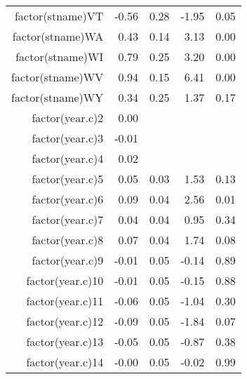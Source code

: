 \begin{table}[ht]
\begin{tabular}{rrrrr}
  factor(stname)VT & -0.56 & 0.28 & -1.95 & 0.05 \\ 
  factor(stname)WA & 0.43 & 0.14 & 3.13 & 0.00 \\ 
  factor(stname)WI & 0.79 & 0.25 & 3.20 & 0.00 \\ 
  factor(stname)WV & 0.94 & 0.15 & 6.41 & 0.00 \\ 
  factor(stname)WY & 0.34 & 0.25 & 1.37 & 0.17 \\ 
  factor(year.c)2 & 0.00 &  &  &  \\ 
  factor(year.c)3 & -0.01 &  &  &  \\ 
  factor(year.c)4 & 0.02 &  &  &  \\ 
  factor(year.c)5 & 0.05 & 0.03 & 1.53 & 0.13 \\ 
  factor(year.c)6 & 0.09 & 0.04 & 2.56 & 0.01 \\ 
  factor(year.c)7 & 0.04 & 0.04 & 0.95 & 0.34 \\ 
  factor(year.c)8 & 0.07 & 0.04 & 1.74 & 0.08 \\ 
  factor(year.c)9 & -0.01 & 0.05 & -0.14 & 0.89 \\ 
  factor(year.c)10 & -0.01 & 0.05 & -0.15 & 0.88 \\ 
  factor(year.c)11 & -0.06 & 0.05 & -1.04 & 0.30 \\ 
  factor(year.c)12 & -0.09 & 0.05 & -1.84 & 0.07 \\ 
  factor(year.c)13 & -0.05 & 0.05 & -0.87 & 0.38 \\ 
  factor(year.c)14 & -0.00 & 0.05 & -0.02 & 0.99 \\ 
   \hline
\end{tabular}
\end{table}
